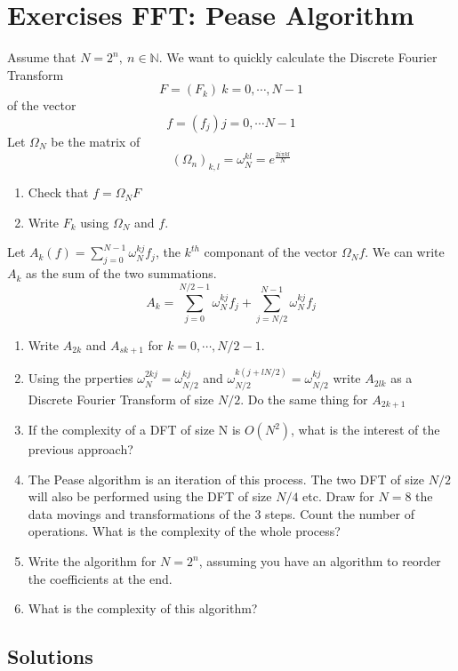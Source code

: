 \section{Exercises FFT: Pease Algorithm}
\label{sec:Exercises FFT: Pease Algorithm}
Assume that $ N = 2^n, \ n \in \mathbb{N} $. We want to quickly calculate the Discrete
Fourier Transform 
\[
F = \left( F_k\right) \ k=0, \cdots, N-1 
\] of the vector 
\[
f = \left( f_j\right) j = 0,\cdots N-1
\]
Let $ \Omega_N $ be the matrix of 
\[
\left( \Omega_n\right) _{ k,l } = \omega _{ N }^{ kl } = e _{  }^{ \frac{ 2i\pi kl }{ N }
}  
\]
\begin{enumerate}
    \item Check that $ f = \Omega_N F $
    \item Write $ F_k  $ using $ \Omega_N $ and $ f $. 
\end{enumerate}
Let $ A_k\left( f\right) = \sum_{j=0}^{N-1} \omega _{ N }^{ kj } f_j $, the $ k^{th} $
componant of the vector $ \Omega_Nf $. We can write $ A_k $ as the sum of the two
summations. 
\[
A_k = \sum_{j=0}^{N/2 -1 } \omega _{ N }^{ kj } f_j + \sum_{j=N/2}^{N-1} \omega _{ N }^{
kj } f_j
\]

\begin{enumerate}
    \item Write $ A _{ 2k }^{  }  $ and $ A_{sk+1}  $ for $ k = 0, \cdots, N/2 -1 $. 
    \item Using the prperties $ \omega _{ N }^{ 2kj } = \omega _{ N/2  }^{ kj }   $ and 
        $ \omega _{ N/2 }^{ k\left( j+lN/2\right)  } = \omega _{ N/2 }^{ kj }  $ write $
        A_{2lk} $ as a Discrete Fourier Transform of size $ N/2 $. Do the same thing for
        $ A_{2k+1} $
    \item If the complexity of a DFT of size N is $ O\left( N^2\right)  $, what is the
        interest of the previous approach? 
    \item The Pease algorithm is an iteration of this process. The two DFT of size $ N/2 $
        will also be performed using the DFT of size $ N/4 $ etc. Draw for $ N=8 $ the
        data movings and transformations of the 3 steps. Count the number of operations.
        What is the complexity of the whole process? 
    \item Write the algorithm for $ N = 2^n $, assuming you have an algorithm to reorder
        the coefficients at the end. 
    \item What is the complexity of this algorithm? 
\end{enumerate}
\subsection{Solutions}
\label{subsec:Solutions}
